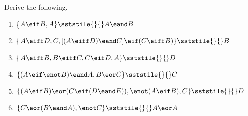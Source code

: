 
\noindent\problempart Derive the following.

\begin{enumerate}[label=(\arabic*)]
\item \{$A \eif B, A\} \sststile{}{} A \eand B$


\item \{$A \eiff D, C, [(A \eiff D) \eand C] \eif (C \eiff B)\} \sststile{}{} B$



\item \{$A \eiff B, B \eiff C, C \eif D, A\} \sststile{}{} D$


\item $\{(A \eif \enot B) \eand A, B \eor C\} \sststile{}{} C$



\item $\{(A \eif B) \eor (C \eif (D \eand E)), \enot (A \eif B), C\} \sststile{}{} D$
%


\item $\{C \eor (B \eand  A),  \enot C\} \sststile{}{} A \eor A$		%


\end{enumerate}
